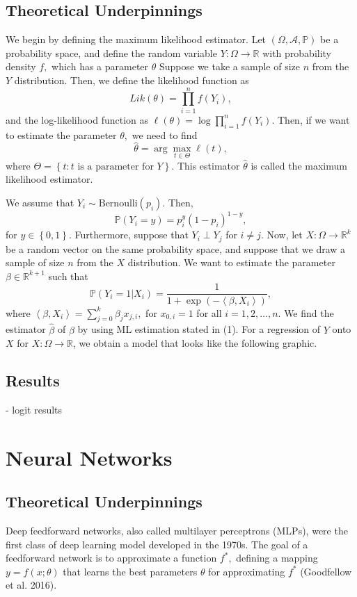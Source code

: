 \documentclass[12pt]{article}  %
\newcommand{\R}{\mathbb R} %
\newcommand{\Prob}[1]{\mathbb P\left({#1}\right)} %
\newcommand{\ip}[2]{\left\langle{#1},{#2}\right\rangle}
\newcommand{\parens}[1]{\left({#1}\right)}
\newcommand{\cb}[1]{\left\{{#1}\right\}}
\theoremstyle{definition}
\theoremstyle{remark}
\begin{document}
\subsection{Theoretical Underpinnings}
We begin by defining the maximum likelihood estimator.  Let $(\Omega, \mathcal{A}, \mathbb{P})$ be a probability space, and define the random variable $Y:\Omega\to \R$ with probability density $f,$ which has a parameter $\theta$  Suppose we take a sample of size $n$ from the $Y$ distribution.  Then, we define the {\color{blue}likelihood function} as
	\[Lik(\theta) = \prod_{i=1}^n f(Y_i),\]
and the {\color{blue}log-likelihood function} as $\ell(\theta) = \log\prod_{i=1}^n f(Y_i)$.  Then, if we want to estimate the parameter $\theta,$ we need to find
	\begin{equation}
		\hat{\theta} = \arg\max_{t\in\Theta} \ell(t),
	\end{equation}
where $\Theta = \cb{t:t\text{ is a parameter for }Y}.$  This estimator $\hat{\theta}$ is called the {\color{blue}maximum likelihood estimator}. 
\par We assume that $Y_i\sim\mathrm{Bernoulli}(p_i)$.  Then,
	\[\Prob{Y_i = y} = p_i^y(1-p_i)^{1-y},\]
for $y\in \cb{0,1}.$  Furthermore, suppose that $Y_i\perp Y_j$ for $i\neq j$.  Now, let $X:\Omega\to \R^{k}$ be a random vector on the same probability space, and suppose that we draw a sample of size $n$ from the $X$ distribution.  We want to estimate the parameter $\beta\in \R^{k+1}$ such that
	\[\Prob{Y_i = 1| X_i} = \frac{1}{1+\exp\parens{-\ip{\beta}{X_i}}},\]
where $\ip{\beta}{X_i} = \sum_{j=0}^{k}\beta_jx_{j,i},$ for $x_{0,i} = 1$ for all $i=1,2,\dots, n$.  We find the estimator $\hat{\beta}$ of $\beta$ by using ML estimation stated in (1).  For a regression of $Y$ onto $X$ for $X:\Omega\to \R$, we obtain a model that looks like the following graphic.


\subsection{Results}
- logit results

\section{Neural Networks}
\subsection{Theoretical Underpinnings}
\par Deep feedforward networks, also called multilayer perceptrons (MLPs), were the first class of deep learning model developed in the 1970s.  The goal of a feedforward network is to approximate a function $f^{*},$ defining a mapping $y=f(x;\theta)$ that learns the best parameters $\theta$ for approximating $f^{*}$ (Goodfellow et al. 2016). 
\end{document}

